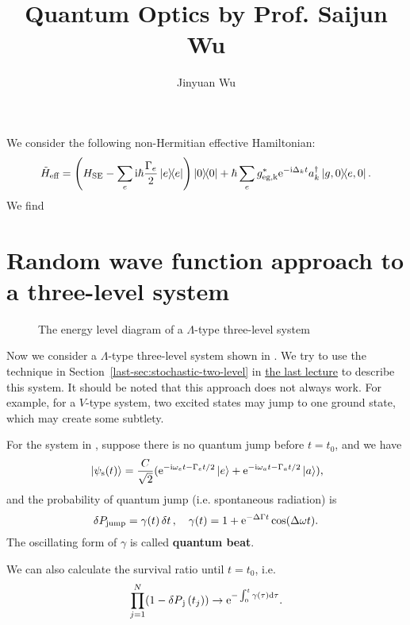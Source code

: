 \documentclass[hyperref, a4paper]{article}
\title{Quantum Optics by Prof. Saijun Wu}
\author{Jinyuan Wu}
\newcommand*{\ii}{\mathrm{i}}
\newcommand*{\ee}{\mathrm{e}}
\newcommand*{\concept}[1]{{\textbf{#1}}}
\newcommand{\lastnote}{\href{12-2.pdf}{the last lecture}}
\begin{document}
\maketitle

We consider the following non-Hermitian effective Hamiltonian:
\begin{equation}
    \tilde{H}_\text{eff} = \left( H_\text{SE} - \sum_e \ii \hbar \frac{\Gamma_e}{2} \dyad{e}  \right) \dyad{0}
    + \hbar \sum_{e} g^*_\text{eg,k} \ee^{- \ii \Delta_k t} a_k^\dagger \dyad{g, 0}{e, 0} .
\end{equation}
We find 

\section{Random wave function approach to a three-level system}

\begin{figure}
    \centering
    
    \caption{The energy level diagram of a $\Lambda$-type three-level system}
    \label{fig:lambda-system}
\end{figure}

Now we consider a $\Lambda$-type three-level system shown in .
We try to use the technique in Section~\ref{last-sec:stochastic-two-level} in \lastnote{} to describe 
this system. It should be noted that this approach does not always work. For example, for a $V$-type 
system, two excited states may jump to one ground state, which may create some subtlety. %

For the system in , suppose there is no quantum jump before $t = t_0$, and we have 
\begin{equation}
    \ket*{\psi_\text{s}(t)} = \frac{C}{\sqrt{2}} (\ee^{-\ii \omega_e t - \Gamma_e t / 2} \ket*{e} + \ee^{- \ii \omega_a t - \Gamma_a t/ 2} \ket*{a}), 
\end{equation}
and the probability of quantum jump (i.e. spontaneous radiation) is 
\begin{equation}
    \var{P_\text{jump}} = \gamma(t) \var{t}, \quad \gamma(t) = 1 + \ee^{- \Delta \Gamma t} \cos(\Delta \omega t).
\end{equation}
The oscillating form of $\gamma$ is called \concept{quantum beat}.

We can also calculate the survival ratio until $t=t_0$, i.e. 
\begin{equation}
    \prod_{j=1}^N (1 - \var{P}_\text{j}(t_j)) \to \ee^{- \int_0^t \gamma(\tau) \dd{\tau}}.
\end{equation}
\end{document}
